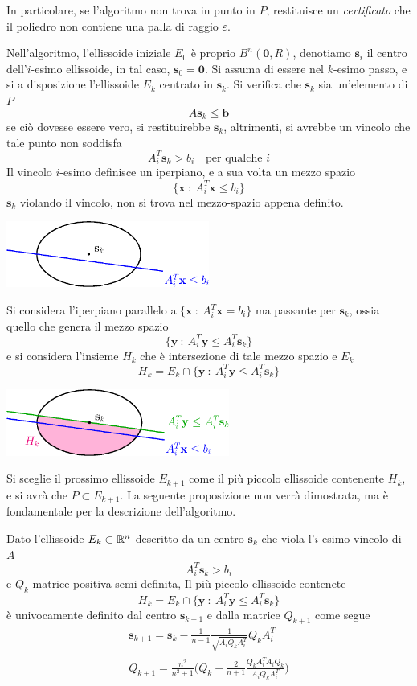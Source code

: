 \documentclass[10pt, letterpaper]{report}
\newcommand{\bb}{{\mathbf{b}}}
\newcommand{\bs}{{\mathbf{s}}}
\newcommand{\x}{{\mathbf{x}}}
\newcommand{\y}{{\mathbf{y}}}
\begin{document}
In particolare, se l'algoritmo non trova in punto in $P$, restituisce un \textit{certificato} che il poliedro non contiene una palla di raggio $\varepsilon$.\bigskip 

Nell'algoritmo, l'ellissoide iniziale $E_0$ è proprio $B^n(\mathbf 0,R)$, denotiamo $\bs_i$ il centro dell'$i$-esimo ellissoide, in tal caso, $\bs_0=\mathbf 0$. Si assuma di essere nel $k$-esimo passo, e si a disposizione l'ellissoide $E_k$ centrato in $\bs_k$. Si verifica che $\bs_k$ sia un'elemento di $P$ 
$$ A\bs_k\le \bb$$
se ciò dovesse essere vero, si restituirebbe $\bs_k$, altrimenti, si avrebbe un vincolo che tale punto non soddisfa 
$$ A_i^T\bs_k>b_i \ \ \ \text{ per qualche } i$$
Il vincolo $i$-esimo definisce un iperpiano, e a sua volta un mezzo spazio 
$$ \{\x \ : \ A_i^T\x\le b_i\}$$
$\bs_k$ violando il vincolo, non si trova nel mezzo-spazio appena definito.\begin{center}
    \includegraphics[width=0.5\textwidth ]{images/taglio_ellissoide.eps}
\end{center}
Si considera l'iperpiano parallelo a $ \{\x \ : \ A_i^T\x= b_i\}$ ma passante per $\bs_k$, ossia quello che genera il mezzo spazio 
$$\{\y \ : \ A_i^T\y\le A_i^T\bs_k\}$$
e si considera l'insieme $H_k$ che è intersezione di tale mezzo spazio e $E_k$
$$ H_k=E_k\cap \{\y \ : \ A_i^T\y\le A_i^T\bs_k\}$$
\begin{center}
    \includegraphics[width=0.55\textwidth ]{images/taglio_ellissoide2.eps}
\end{center}
Si sceglie il prossimo ellissoide $E_{k+1}$ come il più piccolo ellissoide contenente $H_k$, e si avrà che $P\subset E_{k+1}$. La seguente proposizione non verrà dimostrata, ma è fondamentale per la descrizione dell'algoritmo.
\begin{proposizione}
    Dato l'ellissoide $E_k\subset {\mathbb R}^n$ descritto da un centro  $\bs_k$ che viola l'$i$-esimo vincolo di $A$ $$ A_i^T\bs_k>b_i$$
    e $Q_k$ matrice positiva semi-definita, Il più piccolo ellissoide contenete 
    $$ H_k=E_k\cap \{\y \ : \ A_i^T\y\le A_i^T\bs_k\}$$ 
    è univocamente definito dal centro $\bs_{k+1}$ e dalla matrice $Q_{k+1}$ come segue
    \begin{eqnarray}
        \bs_{k+1}=\bs_k-\frac{1}{n-1}\frac{1}{\sqrt{A_iQ_kA_i^T}}Q_kA_i^T\\ 
        Q_{k+1}=\frac{n^2}{n^2+1}\Big(
        Q_k-\frac{2}{n+1}\frac{Q_kA_i^TA_iQ_k}{A_iQ_kA_i^T}    
        \Big)
    \end{eqnarray}
\end{proposizione}
\end{document}
